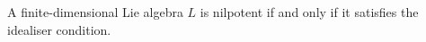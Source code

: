 A finite-dimensional Lie algebra $L$ is nilpotent if and only if it satisfies the
idealiser condition.

